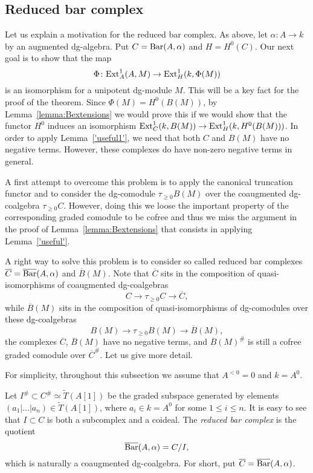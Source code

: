 \documentclass[10pt,russian]{article}
\theoremstyle{plain}
\theoremstyle{definition}
\newcommand{\Barr}{{\rm Bar}}
\newcommand{\Ext}{{\rm Ext}}
\begin{document}
\subsection{Reduced bar complex}
\label{reduced_bar}

Let us explain a motivation for the reduced bar complex. As above, let $\alpha\colon A\to k$ by an augmented dg-algebra. Put $C=\Barr(A,\alpha)$ and $H=H^0(C)$. Our next goal is to show that the map
$$
\Phi\colon \Ext^1_A(A,M)\to \Ext^1_H(k,\Phi(M))
$$
is an isomorphism for a unipotent dg-module $M$. This will be a key fact for the proof of the theorem. Since ${\Phi(M)=H^0(B(M))}$, by Lemma~\ref{lemma:Bextensions} we would prove this if we would show that the functor $H^0$ induces an isomorphism ${\Ext^1_C(k,B(M))\to\Ext^1_H(k,H^0(B(M)))}$. In order to apply Lemma~\ref{'useful1'}, we need that both $C$ and $B(M)$ have no negative terms. However, these complexes do have non-zero negative terms in general.

A first attempt to overcome this problem is to apply the canonical truncation functor and to consider the dg-comodule $\tau_{\geqslant 0}B(M)$ over the coaugmented \mbox{dg-coalgebra} $\tau_{\geqslant 0}C$. However, doing this we loose the important property of the corresponding graded comodule to be cofree and thus we miss the argument in the proof of Lemma~\ref{lemma:Bextensions} that consists in applying Lemma~\ref{'useful'}.

A right way to solve this problem is to consider so called reduced bar complexes~$\overline{C}=\overline{\Barr}(A,\alpha)$ and $\overline{B}(M)$. Note that $\overline{C}$ sits in the composition of quasi-isomorphisms of coaugmented dg-coalgebras
$$
C\to \tau_{\geqslant 0}C\to \overline{C},
$$
while $\overline{B}(M)$ sits in the composition of quasi-isomorphisms of dg-comodules over these dg-coalgebras
$$
B(M)\to \tau_{\geqslant 0}B(M)\to \overline{B}(M),
$$
the complexes $\overline{C}$, $\overline{B}(M)$ have no negative terms, and $\overline{B}(M)^{\#}$ is still a cofree graded comodule over $\overline{C}^{\#}$. Let us give more detail. \medskip

For simplicity, throughout this subsection we assume that $A^{<0}=0$ and $k=A^0$.

Let $I^{\#}\subset C^{\#}\simeq\widetilde{T}(A[1])$ be the graded subspace generated by elements $(a_1| \ldots |a_n) \in \widetilde{T}(A[1])$, where $a_i \in k=A^0$ for some $1\leqslant i\leqslant n$. It is easy to see that $I\subset C$ is both a subcomplex and a coideal. The \emph{reduced bar complex} is the quotient
$$
\overline{\Barr}(A,\alpha) = C/I,
$$
which is naturally a coaugmented dg-coalgebra. For short, put $\overline{C}=\overline{\Barr}(A,\alpha)$.
\end{document}
